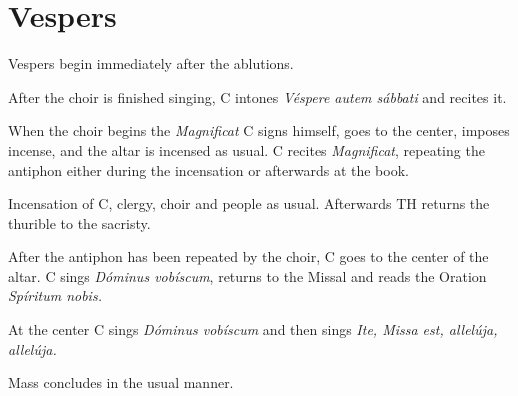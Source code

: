 {\section{Vespers}

\rubric Vespers begin immediately after the ablutions.

\rubric After the choir is finished singing, C intones \textit{Véspere autem
sábbati} and recites it.

\rubric When the choir begins the \textit{Magnificat} C signs himself, goes to
the center, imposes incense, and the altar is incensed as usual. C recites
\textit{Magnificat}, repeating the antiphon either during the
incensation or afterwards at the book.

\rubric Incensation of C, clergy, choir and people as usual. Afterwards TH
returns the thurible to the sacristy.

\rubric After the antiphon has been repeated by the choir, C goes to the center
of the altar. C sings \textit{Dóminus vobíscum}, returns to the Missal
and reads the Oration \textit{Spíritum nobis.}

\rubric At the center C sings \textit{Dóminus vobíscum} and then sings
\textit{Ite, Missa est, allelúja, allelúja.}

\rubric Mass concludes in the usual manner.

}

